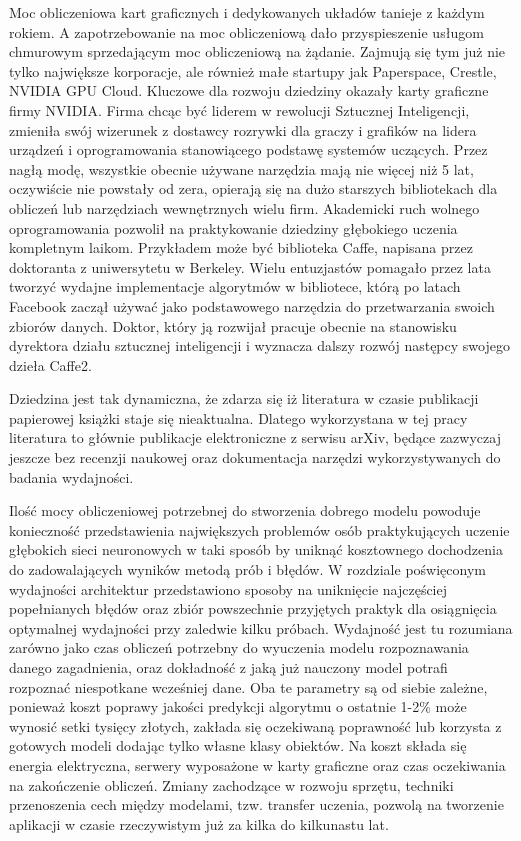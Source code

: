 \documentclass[12pt,a4paper,twoside,titlepage,openright]{book}
\begin{document}
Moc obliczeniowa kart graficznych i dedykowanych układów tanieje z każdym rokiem. A zapotrzebowanie na moc obliczeniową dało przyspieszenie usługom chmurowym sprzedającym moc obliczeniową na żądanie. Zajmują się tym już nie tylko największe korporacje, ale również małe startupy jak Paperspace, Crestle, NVIDIA GPU Cloud. Kluczowe dla rozwoju dziedziny okazały karty graficzne firmy NVIDIA. Firma chcąc być liderem w rewolucji Sztucznej Inteligencji, zmieniła swój wizerunek z dostawcy rozrywki dla graczy i grafików na lidera urządzeń i oprogramowania stanowiącego podstawę systemów uczących. Przez nagłą modę, wszystkie obecnie używane narzędzia mają nie więcej niż 5 lat, oczywiście nie powstały od zera, opierają się na dużo starszych bibliotekach dla obliczeń lub narzędziach wewnętrznych wielu firm. Akademicki ruch wolnego oprogramowania pozwolił na praktykowanie dziedziny głębokiego uczenia kompletnym laikom. Przykładem może być biblioteka Caffe, napisana przez doktoranta z uniwersytetu w Berkeley. Wielu entuzjastów pomagało przez lata tworzyć wydajne implementacje algorytmów w bibliotece, którą po latach Facebook zaczął używać jako podstawowego narzędzia do przetwarzania swoich zbiorów danych. Doktor, który ją rozwijał pracuje obecnie na stanowisku dyrektora działu sztucznej inteligencji i wyznacza dalszy rozwój następcy swojego dzieła Caffe2. 

Dziedzina jest tak dynamiczna, że zdarza się iż literatura w czasie publikacji papierowej książki staje się nieaktualna. Dlatego wykorzystana w tej pracy literatura to głównie publikacje elektroniczne z serwisu arXiv, będące zazwyczaj jeszcze bez recenzji naukowej oraz dokumentacja narzędzi wykorzystywanych do badania wydajności. 

Ilość mocy obliczeniowej potrzebnej do stworzenia dobrego modelu powoduje konieczność przedstawienia największych problemów osób praktykujących uczenie głębokich sieci neuronowych w taki sposób by uniknąć kosztownego dochodzenia do zadowalających wyników metodą prób i błędów. W rozdziale poświęconym wydajności architektur przedstawiono sposoby na uniknięcie najczęściej popełnianych błędów oraz zbiór powszechnie przyjętych praktyk dla osiągnięcia optymalnej wydajności przy zaledwie kilku próbach. Wydajność jest tu rozumiana zarówno jako czas obliczeń potrzebny do wyuczenia modelu rozpoznawania danego zagadnienia, oraz dokładność z jaką już nauczony model potrafi rozpoznać niespotkane wcześniej dane. Oba te parametry są od siebie zależne, ponieważ koszt poprawy jakości predykcji algorytmu o ostatnie 1-2\% może wynosić setki tysięcy złotych, zakłada się oczekiwaną poprawność lub korzysta z gotowych modeli dodając tylko własne klasy obiektów. Na koszt składa się energia elektryczna, serwery wyposażone w karty graficzne oraz czas oczekiwania na zakończenie obliczeń. Zmiany zachodzące w rozwoju sprzętu, techniki przenoszenia cech między modelami, tzw. transfer uczenia, pozwolą na tworzenie aplikacji w czasie rzeczywistym już za kilka do kilkunastu lat.
\end{document}
